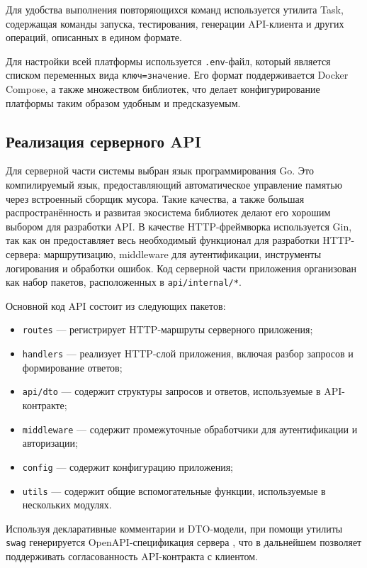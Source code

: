 \documentclass[14pt]{gost-7-32}
\begin{document}
Для удобства выполнения повторяющихся команд используется утилита Task, содержащая команды запуска, тестирования, генерации API-клиента и других операций, описанных в едином формате.

Для настройки всей платформы используется \verb|.env|-файл, который является списком переменных вида \texttt{ключ=значение}. Его формат поддерживается Docker Compose, а также множеством библиотек, что делает конфигурирование платформы таким образом удобным и предсказуемым.


\subsection{Реализация серверного API}

Для серверной части системы выбран язык программирования Go. Это компилируемый язык, предоставляющий автоматическое управление памятью через встроенный сборщик мусора. Такие качества, а также большая распространённость и развитая экосистема библиотек делают его хорошим выбором для разработки API. В качестве HTTP-фреймворка используется Gin, так как он предоставляет весь необходимый функционал для разработки HTTP-сервера: маршрутизацию, middleware для аутентификации, инструменты логирования и обработки ошибок. Код серверной части приложения организован как набор пакетов, расположенных в \texttt{api/internal/*}.


Основной код API состоит из следующих пакетов:

\begin{itemize}
  \item \verb|routes| --- регистрирует HTTP-маршруты серверного приложения;
  \item \verb|handlers| --- реализует HTTP-слой приложения, включая разбор запросов и формирование ответов;
  \item \verb|api/dto| --- содержит структуры запросов и ответов, используемые в API-контракте;
  \item \verb|middleware| --- содержит промежуточные обработчики для аутентификации и авторизации;
  \item \verb|config| --- содержит конфигурацию приложения;
  \item \verb|utils| --- содержит общие вспомогательные функции, используемые в нескольких модулях.
\end{itemize}

Используя декларативные комментарии и DTO-модели, при помощи утилиты \verb|swag| \cite{swaggoSwag} генерируется OpenAPI-спецификация сервера \cite{openapiSpecification}, что в дальнейшем позволяет поддерживать согласованность API-контракта с клиентом.
\end{document}
